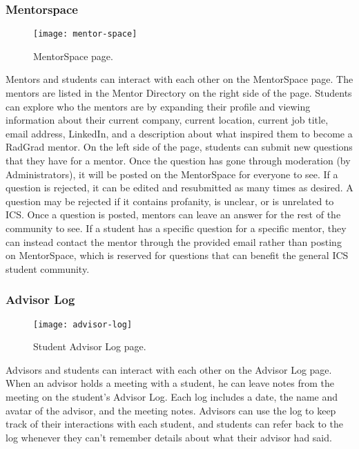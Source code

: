\subsubsection{Mentorspace}
\begin{figure}[h]
\centering
\texttt{[image: mentor-space]}
\caption{MentorSpace page.}
\end{figure}
Mentors and students can interact with each other on the MentorSpace page. The mentors are listed in the Mentor Directory on the right side of the page. Students can explore who the mentors are by expanding their profile and viewing information about their current company, current location, current job title, email address, LinkedIn, and a description about what inspired them to become a RadGrad mentor. On the left side of the page, students can submit new questions that they have for a mentor. Once the question has gone through moderation (by  Administrators), it will be posted on the MentorSpace for everyone to see. If a question is rejected, it can be edited and resubmitted as many times as desired. A question may be rejected if it contains profanity, is unclear, or is unrelated to ICS. Once a question is posted, mentors can leave an answer for the rest of the community to see. If a student has a specific question for a specific mentor, they can instead contact the mentor through the provided email rather than posting on MentorSpace, which is reserved for questions that can benefit the general ICS student community. 

\subsubsection{Advisor Log}
\begin{figure}[h]
\centering
\texttt{[image: advisor-log]}
\caption{Student Advisor Log page.}
\end{figure}
Advisors and students can interact with each other on the Advisor Log page. When an advisor holds a meeting with a student, he can leave notes from the meeting on the student's Advisor Log. Each log includes a date, the name and avatar of the advisor, and the meeting notes. Advisors can use the log to keep track of their interactions with each student, and students can refer back to the log whenever they can't remember details about what their advisor had said. 

